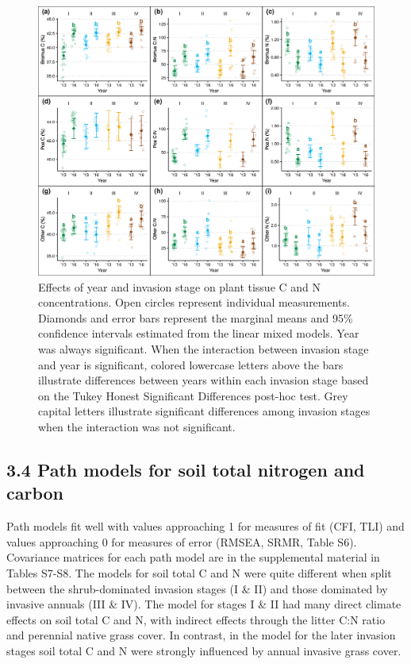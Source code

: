 \documentclass[
  11pt,
  a4paper,
]{article}
\begin{document}
\begin{figure}
\centering
\includegraphics{figures/tidy_plantvars_year.png}
\caption{Effects of year and invasion stage on plant tissue C and N concentrations. Open circles represent individual measurements. Diamonds and error bars represent the marginal means and 95\% confidence intervals estimated from the linear mixed models. Year was always significant. When the interaction between invasion stage and year is significant, colored lowercase letters above the bars illustrate differences between years within each invasion stage based on the Tukey Honest Significant Differences post-hoc test. Grey capital letters illustrate significant differences among invasion stages when the interaction was not significant.}
\end{figure}

\hypertarget{path-models-for-soil-total-nitrogen-and-carbon}{%
\subsection{3.4 Path models for soil total nitrogen and carbon}\label{path-models-for-soil-total-nitrogen-and-carbon}}

Path models fit well with values approaching 1 for measures of fit (CFI, TLI) and values approaching 0 for measures of error (RMSEA, SRMR, Table S6). Covariance matrices for each path model are in the supplemental material in Tables S7-S8. The models for soil total C and N were quite different when split between the shrub-dominated invasion stages (I \& II) and those dominated by invasive annuals (III \& IV). The model for stages I \& II had many direct climate effects on soil total C and N, with indirect effects through the litter C:N ratio and perennial native grass cover. In contrast, in the model for the later invasion stages soil total C and N were strongly influenced by annual invasive grass cover.
\end{document}
